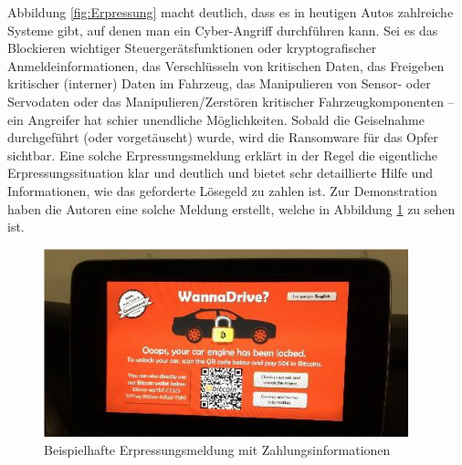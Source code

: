 Abbildung \ref{fig:Erpressung} macht deutlich, dass es in heutigen Autos zahlreiche Systeme gibt, 
auf denen man ein Cyber-Angriff durchführen kann. Sei es das Blockieren wichtiger 
Steuergerätsfunktionen oder kryptografischer Anmeldeinformationen, das Verschlüsseln 
von kritischen Daten, das Freigeben kritischer (interner) Daten im Fahrzeug, das 
Manipulieren von Sensor- oder Servodaten oder das Manipulieren/Zerstören kritischer 
Fahrzeugkomponenten – ein Angreifer hat schier unendliche Möglichkeiten. 
\newline
Sobald die Geiselnahme durchgeführt (oder vorgetäuscht) wurde, wird die Ransomware 
für das Opfer sichtbar. Eine solche Erpressungsmeldung erklärt in der Regel die eigentliche 
Erpressungssituation klar und deutlich und bietet sehr detaillierte Hilfe und Informationen, 
wie das geforderte Lösegeld zu zahlen ist. Zur Demonstration haben die Autoren eine 
solche Meldung erstellt, welche in Abbildung \ref{fig:WannaDrive} zu sehen ist. 
\newline

\begin{figure}[htbp!]
    \centering
    \includegraphics[width=0.94\textwidth]{Images/WannaDrive.png}
    \caption{Beispielhafte Erpressungsmeldung mit Zahlungsinformationen}
    \label{fig:WannaDrive}
\end{figure}
